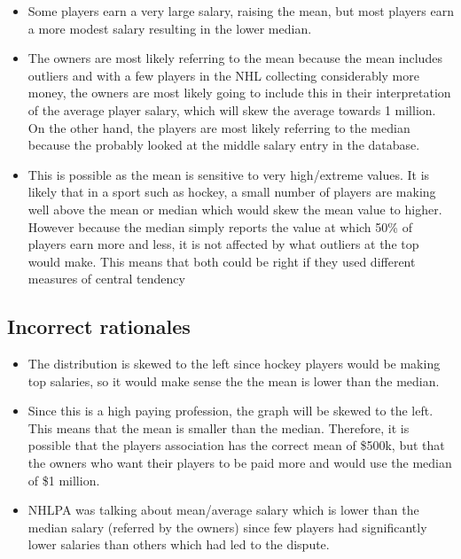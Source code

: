 \documentclass[letterpaper,10pt,twoside,printwatermark=false]{pinp}
\providecommand{\tightlist}{%
  \setlength{\itemsep}{0pt}\setlength{\parskip}{0pt}}
\begin{document}
\begin{itemize}
\tightlist
\item
  Some players earn a very large salary, raising the mean, but most
  players earn a more modest salary resulting in the lower median.
\item
  The owners are most likely referring to the mean because the mean
  includes outliers and with a few players in the NHL collecting
  considerably more money, the owners are most likely going to include
  this in their interpretation of the average player salary, which will
  skew the average towards 1 million. On the other hand, the players are
  most likely referring to the median because the probably looked at the
  middle salary entry in the database.
\item
  This is possible as the mean is sensitive to very high/extreme values.
  It is likely that in a sport such as hockey, a small number of players
  are making well above the mean or median which would skew the mean
  value to higher. However because the median simply reports the value
  at which 50\% of players earn more and less, it is not affected by
  what outliers at the top would make. This means that both could be
  right if they used different measures of central tendency
\end{itemize}

\subsection{Incorrect rationales}\label{incorrect-rationales-5}

\begin{itemize}
\tightlist
\item
  The distribution is skewed to the left since hockey players would be
  making top salaries, so it would make sense the the mean is lower than
  the median.
\item
  Since this is a high paying profession, the graph will be skewed to
  the left. This means that the mean is smaller than the median.
  Therefore, it is possible that the players association has the correct
  mean of \$500k, but that the owners who want their players to be paid
  more and would use the median of \$1 million.
\item
  NHLPA was talking about mean/average salary which is lower than the
  median salary (referred by the owners) since few players had
  significantly lower salaries than others which had led to the dispute.
\end{itemize}





\end{document}
